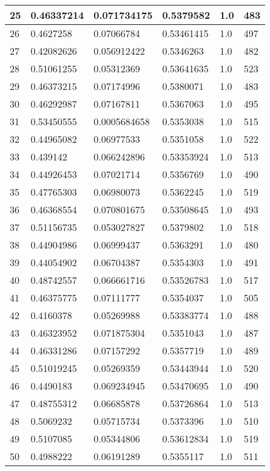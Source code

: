\begin{longtable}{|l|l|l|l|l|l|}
25 & 0.46337214 & 0.071734175 & 0.5379582 & 1.0 & 483 \\ \hline 
26 & 0.4627258 & 0.07066784 & 0.53461415 & 1.0 & 497 \\ \hline 
27 & 0.42082626 & 0.056912422 & 0.5346263 & 1.0 & 482 \\ \hline 
28 & 0.51061255 & 0.05312369 & 0.53641635 & 1.0 & 523 \\ \hline 
29 & 0.46373215 & 0.07174996 & 0.5380071 & 1.0 & 483 \\ \hline 
30 & 0.46292987 & 0.07167811 & 0.5367063 & 1.0 & 495 \\ \hline 
31 & 0.53450555 & 0.0005684658 & 0.5353038 & 1.0 & 515 \\ \hline 
32 & 0.44965082 & 0.06977533 & 0.5351058 & 1.0 & 522 \\ \hline 
33 & 0.439142 & 0.066242896 & 0.53353924 & 1.0 & 513 \\ \hline 
34 & 0.44926453 & 0.07021714 & 0.5356769 & 1.0 & 490 \\ \hline 
35 & 0.47765303 & 0.06980073 & 0.5362245 & 1.0 & 519 \\ \hline 
36 & 0.46368554 & 0.070801675 & 0.53508645 & 1.0 & 493 \\ \hline 
37 & 0.51156735 & 0.053027827 & 0.5379802 & 1.0 & 518 \\ \hline 
38 & 0.44904986 & 0.06999437 & 0.5363291 & 1.0 & 480 \\ \hline 
39 & 0.44054902 & 0.06704387 & 0.5354303 & 1.0 & 491 \\ \hline 
40 & 0.48742557 & 0.066661716 & 0.53526783 & 1.0 & 517 \\ \hline 
41 & 0.46375775 & 0.07111777 & 0.5354037 & 1.0 & 505 \\ \hline 
42 & 0.4160378 & 0.05269988 & 0.53383774 & 1.0 & 488 \\ \hline 
43 & 0.46323952 & 0.071875304 & 0.5351043 & 1.0 & 487 \\ \hline 
44 & 0.46331286 & 0.07157292 & 0.5357719 & 1.0 & 489 \\ \hline 
45 & 0.51019245 & 0.05269359 & 0.53443944 & 1.0 & 520 \\ \hline 
46 & 0.4490183 & 0.069234945 & 0.53470695 & 1.0 & 490 \\ \hline 
47 & 0.48755312 & 0.06685878 & 0.53726864 & 1.0 & 513 \\ \hline 
48 & 0.5069232 & 0.05715734 & 0.5373396 & 1.0 & 510 \\ \hline 
49 & 0.5107085 & 0.05344806 & 0.53612834 & 1.0 & 519 \\ \hline 
50 & 0.4988222 & 0.06191289 & 0.5355117 & 1.0 & 511 \\ \hline 
\end{longtable}